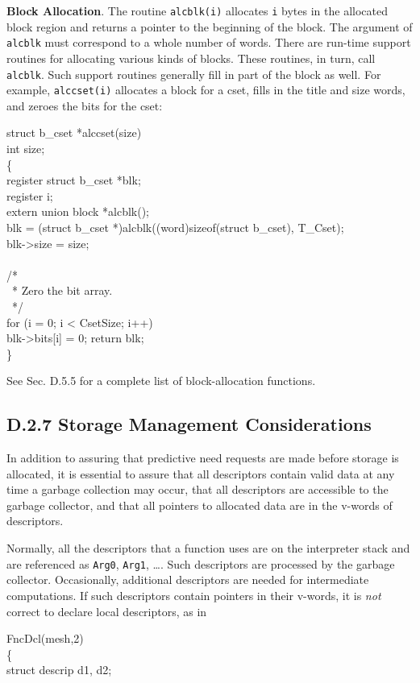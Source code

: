 \textbf{Block Allocation}. The routine \texttt{alcblk(i)} allocates
\texttt{i} bytes in the allocated block region and returns a pointer to the
beginning of the block. The argument of \texttt{alcblk} must correspond to
a whole number of words. There are run-time support routines for allocating
various kinds of blocks. These routines, in turn, call \texttt{alcblk}.
Such support routines generally fill in part of the block as well. For
example, \texttt{alccset(i)} allocates a block for a cset, fills in the
title and size words, and zeroes the bits for the cset:
\goodbreak
\begin{iconcode}
struct b\_cset *alccset(size)\\
int size;\\
\{\\
\>register struct b\_cset *blk;\\
\>register i;\\
\>extern union block *alcblk();\\
\>blk = (struct b\_cset *)alcblk((word)sizeof(struct b\_cset), T\_Cset);\\
\>blk->size = size;\\
\\
\>/*\\
\>\ * Zero the bit array.\\
\>\ */\\
\>for (i = 0; i < CsetSize; i++)\\
\>\>blk->bits[i] = 0; return blk;\\
\}
\end{iconcode}

\noindent
See Sec. D.5.5 for a complete list of block-allocation functions.

\subsection[D.2.7 Storage Management Considerations]%
           {D.2.7 Storage Management Considerations}

In addition to assuring that predictive need requests are made before
storage is allocated, it is essential to assure that all descriptors
contain valid data at any time a garbage collection may occur, that
all descriptors are accessible to the garbage collector, and that all
pointers to allocated data are in the v-words of descriptors.

Normally, all the descriptors that a function uses are on the interpreter
stack and are referenced as \texttt{Arg0}, \texttt{Arg1}, \ldots.  Such
descriptors are processed by the garbage collector. Occasionally,
additional descriptors are needed for intermediate computations. If such
descriptors contain pointers in their v-words, it is \textit{not} correct
to declare local descriptors, as in
\goodbreak
\begin{iconcode}
\color{red}FncDcl(mesh,2)\\
\{\\
\>struct descrip d1, d2;
\end{iconcode}

